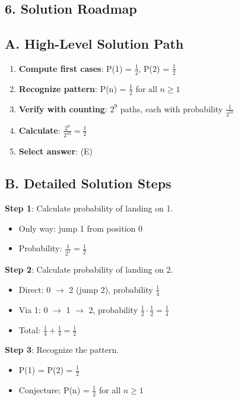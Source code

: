 \documentclass[11pt]{article}
\begin{document}
\begin{roadmapbox}
\section*{6. Solution Roadmap}

\subsection*{A. High-Level Solution Path}
\begin{enumerate}[leftmargin=*]
    \item \textbf{Compute first cases}: P(1) = $\frac{1}{2}$, P(2) = $\frac{1}{2}$
    \item \textbf{Recognize pattern}: P(n) = $\frac{1}{2}$ for all $n \geq 1$
    \item \textbf{Verify with counting}: $2^9$ paths, each with probability $\frac{1}{2^{10}}$
    \item \textbf{Calculate}: $\frac{2^9}{2^{10}} = \frac{1}{2}$
    \item \textbf{Select answer}: (E)
\end{enumerate}

\subsection*{B. Detailed Solution Steps}

\textbf{Step 1}: Calculate probability of landing on 1.
\begin{itemize}
    \item Only way: jump 1 from position 0
    \item Probability: $\frac{1}{2^1} = \frac{1}{2}$
\end{itemize}

\textbf{Step 2}: Calculate probability of landing on 2.
\begin{itemize}
    \item Direct: 0 $\to$ 2 (jump 2), probability $\frac{1}{4}$
    \item Via 1: 0 $\to$ 1 $\to$ 2, probability $\frac{1}{2} \cdot \frac{1}{2} = \frac{1}{4}$
    \item Total: $\frac{1}{4} + \frac{1}{4} = \frac{1}{2}$
\end{itemize}

\textbf{Step 3}: Recognize the pattern.
\begin{itemize}
    \item P(1) = P(2) = $\frac{1}{2}$
    \item Conjecture: P(n) = $\frac{1}{2}$ for all $n \geq 1$
\end{itemize}


\end{roadmapbox}
\end{document}
